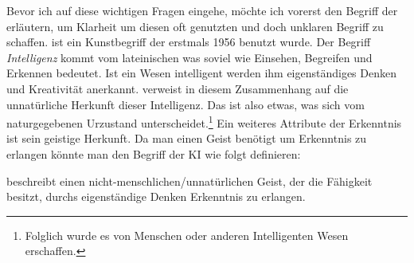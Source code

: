 \documentclass[12pt,german,ngerman]{report}
\begin{document}
    Bevor ich auf diese wichtigen Fragen eingehe, möchte ich vorerst den Begriff der 
    erläutern, um Klarheit um diesen oft genutzten und doch unklaren Begriff zu schaffen.  ist ein Kunstbegriff der erstmals
    1956\autocite[57]{buchanan2005very} benutzt wurde.
    Der Begriff \emph{Intelligenz} kommt vom lateinischen  was soviel wie
    Einsehen, Begreifen und Erkennen bedeutet.\autocite{piaget2000psychologie} Ist ein Wesen intelligent werden ihm eigenständiges Denken und Kreativität
    anerkannt.
     verweist in diesem Zusammenhang auf die unnatürliche Herkunft dieser Intelligenz. Das  ist also etwas, was
    sich vom naturgegebenen Urzustand unterscheidet.\footnote{Folglich wurde es von Menschen oder anderen Intelligenten Wesen erschaffen.}
    Ein weiteres Attribute der Erkenntnis ist sein geistige Herkunft.\autocite{duden2021erkenntnis}
    Da man einen Geist benötigt um Erkenntnis zu erlangen könnte man den Begriff der KI wie folgt definieren:
    \begin{displayquote}
         beschreibt einen nicht-menschlichen/unnatürlichen Geist,
        der die Fähigkeit besitzt, durchs eigenständige Denken Erkenntnis zu erlangen.
    \end{displayquote}
\end{document}
